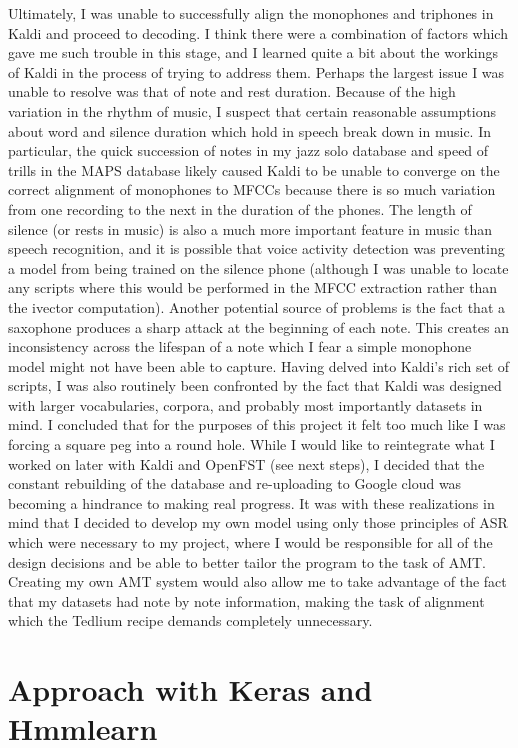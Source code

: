 \documentclass[conference]{IEEEtran}
\begin{document}
Ultimately, I was unable to successfully align the monophones and triphones in Kaldi and proceed to decoding. I think there were a combination of factors which gave me such trouble in this stage, and I learned quite a bit about the workings of Kaldi in the process of trying to address them. Perhaps the largest issue I was unable to resolve was that of note and rest duration. Because of the high variation in the rhythm of music, I suspect that certain reasonable assumptions about word and silence duration which hold in speech break down in music. In particular, the quick succession of notes in my jazz solo database and speed of trills in the MAPS database likely caused Kaldi to be unable to converge on the correct alignment of monophones to MFCCs because there is so much variation from one recording to the next in the duration of the phones. The length of silence (or rests in music) is also a much more important feature in music than speech recognition, and it is possible that voice activity detection was preventing a model from being trained on the silence phone (although I was unable to locate any scripts where this would be performed in the MFCC extraction rather than the ivector computation). Another potential source of problems is the fact that a saxophone produces a sharp attack at the beginning of each note. This creates an inconsistency across the lifespan of a note which I fear a simple monophone model might not have been able to capture. Having delved into Kaldi's rich set of scripts, I was also routinely been confronted by the fact that Kaldi was designed with larger vocabularies, corpora, and probably most importantly datasets in mind. I concluded that for the purposes of this project it felt too much like I was forcing a square peg into a round hole. While I would like to reintegrate what I worked on later with Kaldi and OpenFST (see next steps), I decided that the constant rebuilding of the database and re-uploading to Google cloud was becoming a hindrance to making real progress. It was with these realizations in mind that I decided to develop my own model using only those principles of ASR which were necessary to my project, where I would be responsible for all of the design decisions and be able to better tailor the program to the task of AMT. Creating my own AMT system would also allow me to take advantage of the fact that my datasets had note by note information, making the task of alignment which the Tedlium recipe demands completely unnecessary.


\section{Approach with Keras and Hmmlearn}
\end{document}
